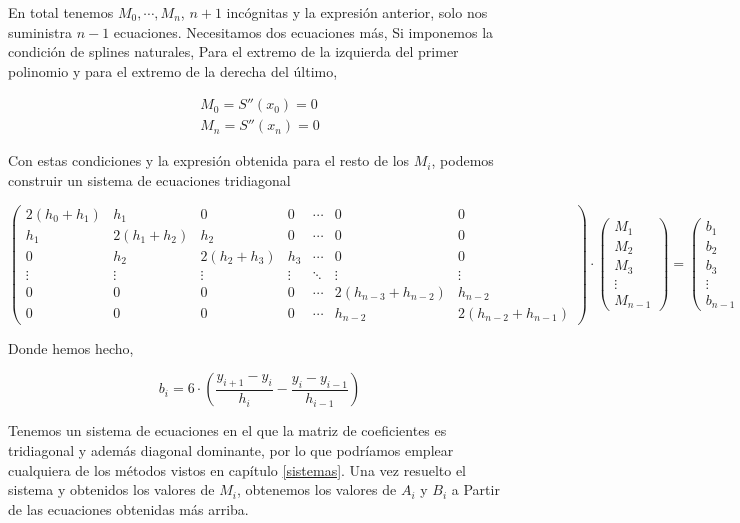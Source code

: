 En total tenemos $M_0,\cdots, M_n$, $n+1$ incógnitas y la expresión anterior, solo nos suministra $n-1$ ecuaciones. Necesitamos dos ecuaciones más, Si imponemos la condición de splines naturales, Para el extremo de la izquierda del primer polinomio y para el extremo de la derecha del último,

\begin{align*}
M_0=S''(x_0)=0\\
M_n=S''(x_n)=0
\end{align*}

Con estas condiciones y la expresión obtenida para el resto de los $M_i$, podemos construir un sistema de ecuaciones tridiagonal

\begin{equation*}
\begin{pmatrix}
2(h_0+h_1) & h_1 & 0 &0&\cdots &0&0\\
 h_1 & 2(h_1+h_2) & h_2 &0& \cdots&0 & 0\\
0& h_2 & 2(h_2+h_3) & h_3 &\cdots &0& 0\\
\vdots & \vdots & \vdots &\vdots& \ddots & \vdots&\vdots \\
0 & 0 & 0&0&\cdots& 2(h_{n-3}+h_{n-2}) & h_{n-2} \\ 
0 & 0 & 0&0&\cdots&h_{n-2} & 2(h_{n-2}+h_{n-1})
\end{pmatrix}\cdot \begin{pmatrix}
M_1\\
M_2\\
M_3\\
\vdots \\
M_{n-1}
\end{pmatrix}=\begin{pmatrix}
b_1\\
b_2\\
b_3\\
\vdots \\
b_{n-1}
\end{pmatrix}
\end{equation*}

Donde hemos hecho,

\begin{equation*}
b_i=6\cdot \left(\frac{y_{i+1}-y_i}{h_i}-\frac{y_i-y_{i-1}}{h_{i-1}}\right)
\end{equation*}

Tenemos un sistema de ecuaciones en el que la matriz de coeficientes es tridiagonal y además diagonal dominante, por lo que podríamos emplear cualquiera de los métodos vistos en capítulo  
\ref{sistemas}.  Una vez resuelto el sistema y obtenidos los valores de $M_i$, obtenemos los valores de $A_i$ y $B_i$ a Partir de las ecuaciones obtenidas más arriba.

